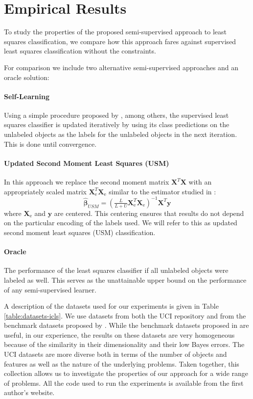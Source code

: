 \documentclass[twoside]{memoir}\usepackage[]{graphicx}\usepackage{xcolor}
\newcommand{\Xe}{\mathbf{X}_\mathrm{e}  }
\newcommand{\XeT}{\mathbf{X}_\mathrm{e}^T}
\newcommand{\Nunl}{U}
\newcommand{\Nlab}{L}
\begin{document}
\section{Empirical Results} 
\label{section:empiricalresults}
To study the properties of the proposed semi-supervised approach to least squares classification, we compare how this approach fares against supervised least squares classification without the constraints. 

For comparison we include two alternative semi-supervised approaches and an oracle solution: 
\paragraph{Self-Learning} Using a simple procedure proposed by \citet{McLachlan1975}, among others, the supervised least squares classifier is updated iteratively by using its class predictions on the unlabeled objects as the labels for the unlabeled objects in the next iteration. This is done until convergence.

\paragraph{Updated Second Moment Least Squares (USM)} In this approach we replace the second moment matrix $\mathbf{X}^T \mathbf{X}$ with an appropriately scaled matrix $\XeT \Xe$ similar to the estimator studied in \citep{Shaffer1991}:
$$
\boldsymbol{\hat{\beta}}_{USM} = \left( \tfrac{\Nlab}{\Nlab+\Nunl} \XeT \Xe \right)^{-1} \mathbf{X}^T \mathbf{y}
$$
where $\Xe$ and $\mathbf{y}$ are centered. This centering ensures that results do not depend on the particular encoding of the labels used. We will refer to this as updated second moment least squares (USM) classification. 

\paragraph{Oracle} The performance of the least squares classifier if all unlabeled objects were labeled as well. This serves as the unattainable upper bound on the performance of any semi-supervised learner. 


A description of the datasets used for our experiments is given in Table \ref{table:datasets-icls}. We use datasets from both the UCI repository \citep{Lichman2013} and from the benchmark datasets proposed by \citet{Chapelle2006}. While the benchmark datasets proposed in \citet{Chapelle2006} are useful, in our experience, the results on these datasets are very homogeneous because of the similarity in their dimensionality and their low Bayes errors. The UCI datasets are more diverse both in terms of the number of objects and features as well as the nature of the underlying problems. Taken together, this collection allows us to investigate the properties of our approach for a wide range of problems.
All the code used to run the experiments is available from the first author's website.
\end{document}
